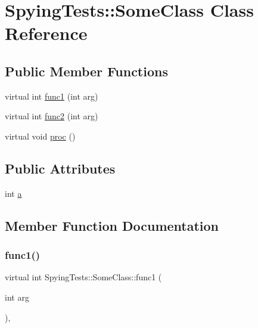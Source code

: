\hypertarget{classSpyingTests_1_1SomeClass}{}\section{Spying\+Tests\+::Some\+Class Class Reference}
\label{classSpyingTests_1_1SomeClass}
\subsection*{Public Member Functions}
\begin{DoxyCompactItemize}
\item 
virtual int \mbox{\hyperlink{classSpyingTests_1_1SomeClass_aac9f67d9eebee35f47870bd6db040d9e}{func1}} (int arg)
\item 
virtual int \mbox{\hyperlink{classSpyingTests_1_1SomeClass_ae6d1bd007e56c7c54e0b95dfa8a9621e}{func2}} (int arg)
\item 
virtual void \mbox{\hyperlink{classSpyingTests_1_1SomeClass_a434e519d6f77c5ee8db5dd9f71da9b8d}{proc}} ()
\end{DoxyCompactItemize}
\subsection*{Public Attributes}
\begin{DoxyCompactItemize}
\item 
int \mbox{\hyperlink{classSpyingTests_1_1SomeClass_a08f9d9f44b0f8a20f669b650806972c3}{a}}
\end{DoxyCompactItemize}


\subsection{Member Function Documentation}
\mbox{\label{classSpyingTests_1_1SomeClass_aac9f67d9eebee35f47870bd6db040d9e}} 
\subsubsection{\texorpdfstring{func1()}{func1()}}
{\footnotesize\ttfamily virtual int Spying\+Tests\+::\+Some\+Class\+::func1 (\begin{DoxyParamCaption}\item[{int}]{arg }\end{DoxyParamCaption})\hspace{0.3cm}{\ttfamily [inline]}, {\ttfamily [virtual]}}

